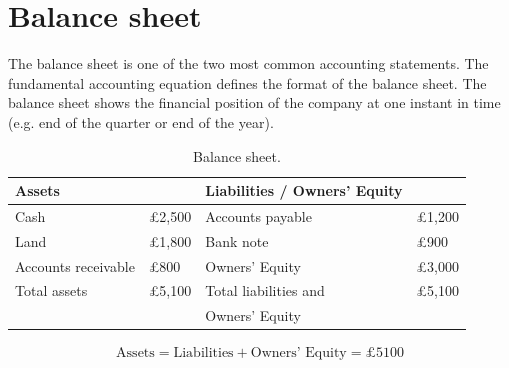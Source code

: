 \section{Balance sheet}
The balance sheet is one of the two most common accounting statements. The fundamental accounting equation defines the format of the balance sheet. The balance sheet shows the financial position of the company at one instant in time (e.g. end of the quarter or end of the year).
\begin{table}[H]
    \centering
    \begin{tabular}{@{}llll@{}}
        \toprule
        Assets              &               & Liabilities / Owners' Equity &               \\
        \midrule
        Cash                & \pounds 2,500 & Accounts payable             & \pounds 1,200 \\
        Land                & \pounds 1,800 & Bank note                    & \pounds 900   \\
        Accounts receivable & \pounds 800   & Owners' Equity               & \pounds 3,000 \\
        \midrule
        Total assets        & \pounds 5,100 & Total liabilities and        & \pounds 5,100 \\
                            &               & Owners' Equity               &               \\
        \bottomrule
    \end{tabular}
    \caption{Balance sheet.}
\end{table}
\begin{gather}
    \textrm{Assets} = \textrm{Liabilities} + \textrm{Owners' Equity} = \pounds 5100
\end{gather}
